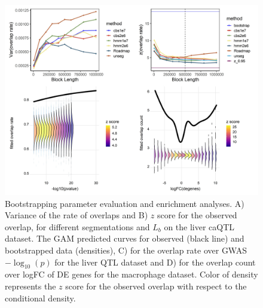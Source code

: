 \begin{figure}[hbtp]
\centering%
\setlength{\abovecaptionskip}{-0.1cm}
\setlength{\belowcaptionskip}{-0.1cm}
\includegraphics[scale=0.25]{Figures/fig2.jpeg}
\caption{
  Bootstrapping parameter evaluation and enrichment analyses. 
  A) Variance of the rate of overlaps and
  B) $z$ score for the observed overlap,
  for different segmentations and $L_b$ on the liver caQTL
  dataset.
  The GAM predicted curves for observed (black line) and
  bootstrapped data (densities),
  C) for the overlap rate over GWAS $-\log_{10}(p)$ for the liver QTL
  dataset and
  D) for the overlap count over logFC of DE genes for the macrophage
  dataset.
  Color of density represents the $z$ score for the observed overlap
  with respect to the conditional density.
}
\label{fig:result}
\vspace{-0.7cm}
\end{figure}


